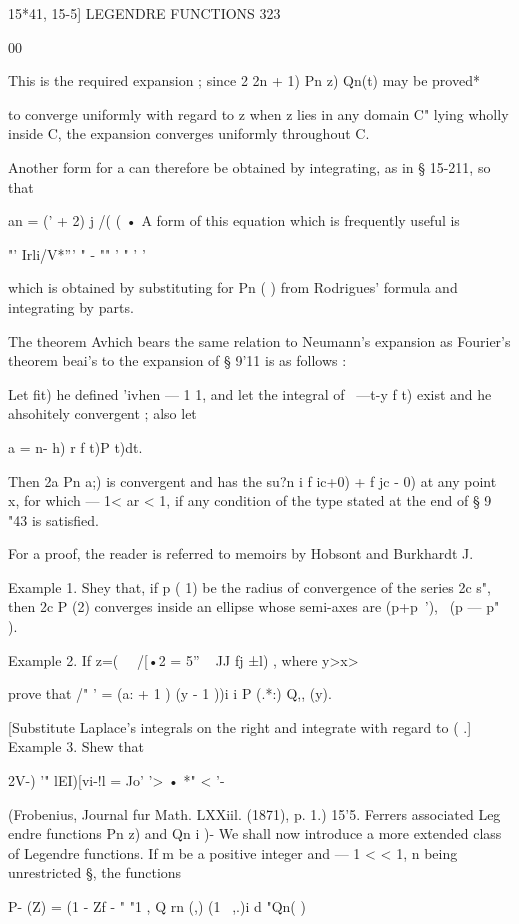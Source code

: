 {{{15*41, 15-5] LEGENDRE FUNCTIONS 323

00

This is the required expansion ; since 2 2n + 1) Pn z) Qn(t) may be
proved*

to converge uniformly with regard to z when z lies in any domain C"
lying wholly inside C, the expansion converges uniformly throughout C.

Another form for a can therefore be obtained by integrating, as in §
15-211, so that

an = (' + 2) j /( ( • A form of this equation which is frequently
useful is

"' Irli/V*''' " - "" ' " ' '

which is obtained by substituting for Pn ( ) from Rodrigues' formula
and integrating by parts.

The theorem Avhich bears the same relation to Neumann's expansion as
Fourier's theorem beai's to the expansion of § 9'11 is as follows :

Let fit) he defined 'ivhen — 1 1, and let the integral of \ —t-y f t)
exist and he ahsohitely convergent ; also let

a = n- h) r f t)P t)dt.

Then 2a Pn a;) is convergent and has the su?n i f ic+0) + f jc - 0) at
any point x, for which — 1< ar < 1, if any condition of the type
stated at the end of § 9 "43 is satisfied.

For a proof, the reader is referred to memoirs by Hobsont and
Burkhardt J.

Example 1. Shey that, if p ( 1) be the radius of convergence of the
series 2c s", then 2c P (2) converges inside an ellipse whose
semi-axes are (p+p~'), \ (p — p" ).

Example 2. If z=( \ \ /[•2 = 5'' ~ JJ fj ±l) , where y>x>\,

prove that /" ' = (a: + 1 ) (y - 1 ))i i P (.*:) Q,, (y).

[Substitute Laplace's integrals on the right and integrate with regard
to ( .] Example 3. Shew that

2V-) '" lEI)[vi-!l = Jo' '> • *" < '-

(Frobenius, Journal fur Math. LXXiil. (1871), p. 1.) 15'5. Ferrers
associated Leg endre functions Pn z) and Qn i )- We shall now
introduce a more extended class of Legendre functions. If m be a
positive integer and — 1 < < 1, n being unrestricted §, the functions

P- (Z) = (1 - Zf - " "1 , Q rn (,) (1 \ ,.)i d "Qn( )

}}}
